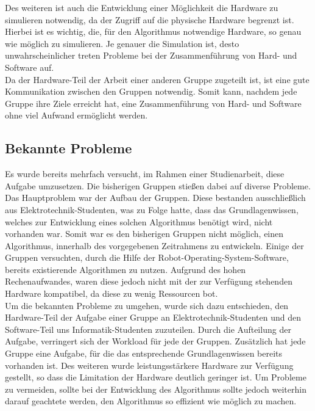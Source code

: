 Des weiteren ist auch die Entwicklung einer Möglichkeit die Hardware zu simulieren notwendig, da der Zugriff auf die physische Hardware begrenzt ist.
Hierbei ist es wichtig, die, für den Algorithmus notwendige Hardware, so genau wie möglich zu simulieren.
Je genauer die Simulation ist, desto unwahrscheinlicher treten Probleme bei der Zusammenführung von Hard- und Software auf. \\

Da der Hardware-Teil der Arbeit einer anderen Gruppe zugeteilt ist, ist eine gute Kommunikation zwischen den Gruppen notwendig.
Somit kann, nachdem jede Gruppe ihre Ziele erreicht hat, eine Zusammenführung von Hard- und Software ohne viel Aufwand ermöglicht werden. \\

\subsection{Bekannte Probleme}
Es wurde bereits mehrfach versucht, im Rahmen einer Studienarbeit, diese Aufgabe umzusetzen.
Die bisherigen Gruppen stießen dabei auf diverse Probleme.
Das Hauptproblem war der Aufbau der Gruppen.
Diese bestanden ausschließlich aus Elektrotechnik-Studenten, was zu Folge hatte, dass das Grundlagenwissen, welches zur Entwicklung eines solchen Algorithmus benötigt wird, nicht vorhanden war.
Somit war es den bisherigen Gruppen nicht möglich, einen Algorithmus, innerhalb des vorgegebenen Zeitrahmens zu entwickeln.
Einige der Gruppen versuchten, durch die Hilfe der Robot-Operating-System-Software, bereits existierende Algorithmen zu nutzen.
Aufgrund des hohen Rechenaufwandes, waren diese jedoch nicht mit der zur Verfügung stehenden Hardware kompatibel, da diese zu wenig Ressourcen bot. \\


Um die bekannten Probleme zu umgehen, wurde sich dazu entschieden, den Hardware-Teil der Aufgabe einer Gruppe an Elektrotechnik-Studenten und den Software-Teil uns Informatik-Studenten zuzuteilen.
Durch die Aufteilung der Aufgabe, verringert sich der Workload für jede der Gruppen.
Zusätzlich hat jede Gruppe eine Aufgabe, für die das entsprechende Grundlagenwissen bereits vorhanden ist.
Des weiteren wurde leistungsstärkere Hardware zur Verfügung gestellt, so dass die Limitation der Hardware deutlich geringer ist.
Um Probleme zu vermeiden, sollte bei der Entwicklung des Algorithmus sollte jedoch weiterhin darauf geachtete werden, den Algorithmus so effizient wie möglich zu machen.

\newpage
